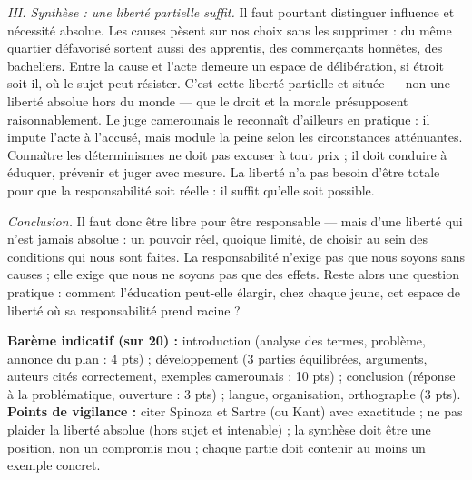 \documentclass[11pt]{article}
\begin{document}
\begin{corrige}
\emph{III. Synthèse : une liberté partielle suffit.} Il faut pourtant distinguer influence et nécessité absolue. Les causes pèsent sur nos choix sans les supprimer : du même quartier défavorisé sortent aussi des apprentis, des commerçants honnêtes, des bacheliers. Entre la cause et l'acte demeure un espace de délibération, si étroit soit-il, où le sujet peut résister. C'est cette liberté partielle et située — non une liberté absolue hors du monde — que le droit et la morale présupposent raisonnablement. Le juge camerounais le reconnaît d'ailleurs en pratique : il impute l'acte à l'accusé, mais module la peine selon les circonstances atténuantes. Connaître les déterminismes ne doit pas excuser à tout prix ; il doit conduire à éduquer, prévenir et juger avec mesure. La liberté n'a pas besoin d'être totale pour que la responsabilité soit réelle : il suffit qu'elle soit possible.

\emph{Conclusion.} Il faut donc être libre pour être responsable — mais d'une liberté qui n'est jamais absolue : un pouvoir réel, quoique limité, de choisir au sein des conditions qui nous sont faites. La responsabilité n'exige pas que nous soyons sans causes ; elle exige que nous ne soyons pas que des effets. Reste alors une question pratique : comment l'éducation peut-elle élargir, chez chaque jeune, cet espace de liberté où sa responsabilité prend racine ?

\textbf{Barème indicatif (sur 20) :} introduction (analyse des termes, problème, annonce du plan : 4 pts) ; développement (3 parties équilibrées, arguments, auteurs cités correctement, exemples camerounais : 10 pts) ; conclusion (réponse à la problématique, ouverture : 3 pts) ; langue, organisation, orthographe (3 pts).
\textbf{Points de vigilance :} citer Spinoza et Sartre (ou Kant) avec exactitude ; ne pas plaider la liberté absolue (hors sujet et intenable) ; la synthèse doit être une position, non un compromis mou ; chaque partie doit contenir au moins un exemple concret.
\end{corrige}
\end{document}
